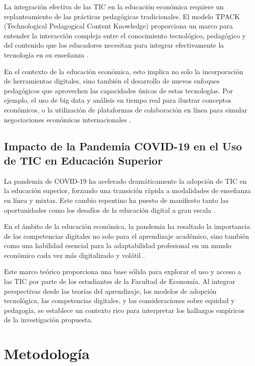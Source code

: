 \documentclass[12pt, a4paper]{article}
\begin{document}
La integración efectiva de las TIC en la educación económica requiere un replanteamiento de las prácticas pedagógicas tradicionales. El modelo TPACK (Technological Pedagogical Content Knowledge) proporciona un marco para entender la interacción compleja entre el conocimiento tecnológico, pedagógico y del contenido que los educadores necesitan para integrar efectivamente la tecnología en su enseñanza \parencite{Mishra2006}.

En el contexto de la educación económica, esto implica no solo la incorporación de herramientas digitales, sino también el desarrollo de nuevos enfoques pedagógicos que aprovechen las capacidades únicas de estas tecnologías. Por ejemplo, el uso de big data y análisis en tiempo real para ilustrar conceptos económicos, o la utilización de plataformas de colaboración en línea para simular negociaciones económicas internacionales \parencite{Watts2017}.

\subsection{Impacto de la Pandemia COVID-19 en el Uso de TIC en Educación Superior}

La pandemia de COVID-19 ha acelerado dramáticamente la adopción de TIC en la educación superior, forzando una transición rápida a modalidades de enseñanza en línea y mixtas. Este cambio repentino ha puesto de manifiesto tanto las oportunidades como los desafíos de la educación digital a gran escala \parencite{Hodges2020}.

En el ámbito de la educación económica, la pandemia ha resaltado la importancia de las competencias digitales no solo para el aprendizaje académico, sino también como una habilidad esencial para la adaptabilidad profesional en un mundo económico cada vez más digitalizado y volátil \parencite{Blundell2020}.

Este marco teórico proporciona una base sólida para explorar el uso y acceso a las TIC por parte de los estudiantes de la Facultad de Economía. Al integrar perspectivas desde las teorías del aprendizaje, los modelos de adopción tecnológica, las competencias digitales, y las consideraciones sobre equidad y pedagogía, se establece un contexto rico para interpretar los hallazgos empíricos de la investigación propuesta.

\section{Metodología}
\end{document}
